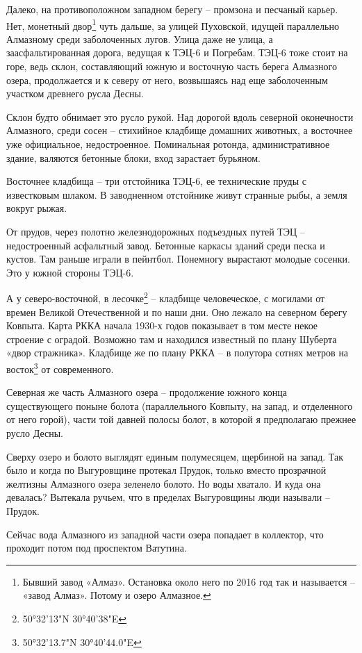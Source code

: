 Далеко, на противоположном западном берегу – промзона и песчаный карьер. Нет, монетный двор\footnote{Бывший завод «Алмаз». Остановка около него по 2016 год так и называется – «завод Алмаз». Потому и озеро Алмазное.} чуть дальше, за улицей Пуховской, идущей параллельно Алмазному среди заболоченных лугов. Улица даже не улица, а заасфальтированная дорога, ведущая к ТЭЦ-6 и Погребам. ТЭЦ-6 тоже стоит на горе, ведь склон, составляющий южную и восточную часть берега Алмазного озера, продолжается и к северу от него, возвышаясь над еще заболоченным участком древнего русла Десны.

Склон будто обнимает это русло рукой. Над дорогой вдоль северной оконечности Алмазного, среди сосен – стихийное кладбище домашних животных, а восточнее уже официальное, недостроенное. Поминальная ротонда, административное здание, валяются бетонные блоки, вход зарастает бурьяном.

Восточнее кладбища – три отстойника ТЭЦ-6, ее технические пруды с известковым шлаком. В заводненном отстойнике живут странные рыбы, а земля вокруг рыжая.

От прудов, через полотно железнодорожных подъездных путей ТЭЦ – недостроенный асфальтный завод. Бетонные каркасы зданий среди песка и кустов. Там раньше играли в пейнтбол. Понемногу вырастают молодые сосенки. Это у южной стороны ТЭЦ-6.

А у северо-восточной, в лесочке\footnote{50°32'13"N 30°40'38"E} – кладбище человеческое, с могилами от времен Великой Отечественной и по наши дни. Оно лежало на северном берегу Ковпыта. Карта РККА начала 1930-х годов показывает в том месте некое строение с оградой. Возможно там и находился известный по плану Шуберта «двор стражника». Кладбище же по плану РККА – в полутора сотнях метров на восток\footnote{50°32'13.7"N 30°40'44.0"E} от современного.

Северная же часть Алмазного озера – продолжение южного конца существующего поныне болота (параллельного Ковпыту, на запад, и отделенного от него горой), части той давней полосы болот, в которой я предполагаю прежнее русло Десны.

Сверху озеро и болото выглядят единым полумесяцем, щербиной на запад. Так было и когда по Выгуровщине протекал Прудок, только вместо прозрачной желтизны Алмазного озера зеленело болото. Но воды хватало. И куда она девалась? Вытекала ручьем, что в пределах Выгуровщины люди называли – Прудок.

Сейчас вода Алмазного из западной части озера попадает в коллектор, что проходит потом под проспектом Ватутина.
